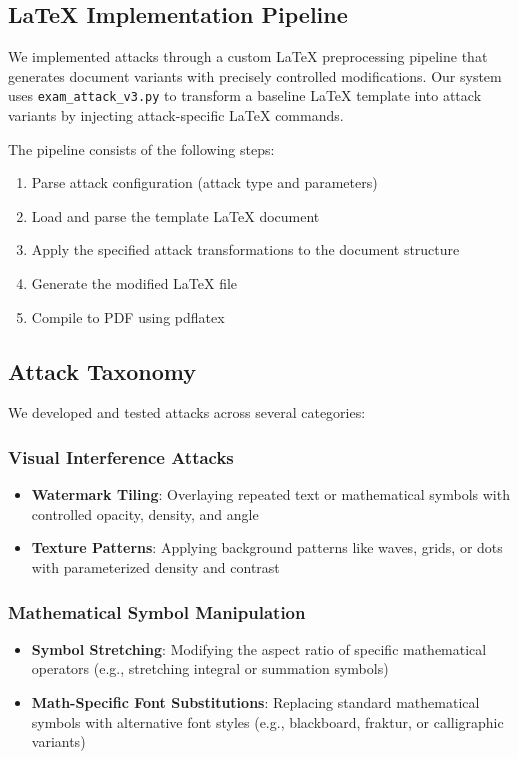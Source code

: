 \documentclass[conference]{IEEEtran}
\begin{document}
\subsection{LaTeX Implementation Pipeline}
We implemented attacks through a custom LaTeX preprocessing pipeline that generates document variants with precisely controlled modifications. Our system uses \texttt{exam\_attack\_v3.py} to transform a baseline LaTeX template into attack variants by injecting attack-specific LaTeX commands.

The pipeline consists of the following steps:
\begin{enumerate}
    \item Parse attack configuration (attack type and parameters)
    \item Load and parse the template LaTeX document
    \item Apply the specified attack transformations to the document structure
    \item Generate the modified LaTeX file
    \item Compile to PDF using pdflatex
\end{enumerate}

\subsection{Attack Taxonomy}
We developed and tested attacks across several categories:

\subsubsection{Visual Interference Attacks}
\begin{itemize}
    \item \textbf{Watermark Tiling}: Overlaying repeated text or mathematical symbols with controlled opacity, density, and angle
    \item \textbf{Texture Patterns}: Applying background patterns like waves, grids, or dots with parameterized density and contrast
\end{itemize}

\subsubsection{Mathematical Symbol Manipulation}
\begin{itemize}
    \item \textbf{Symbol Stretching}: Modifying the aspect ratio of specific mathematical operators (e.g., stretching integral or summation symbols)
    \item \textbf{Math-Specific Font Substitutions}: Replacing standard mathematical symbols with alternative font styles (e.g., blackboard, fraktur, or calligraphic variants)
\end{itemize}
\end{document}
